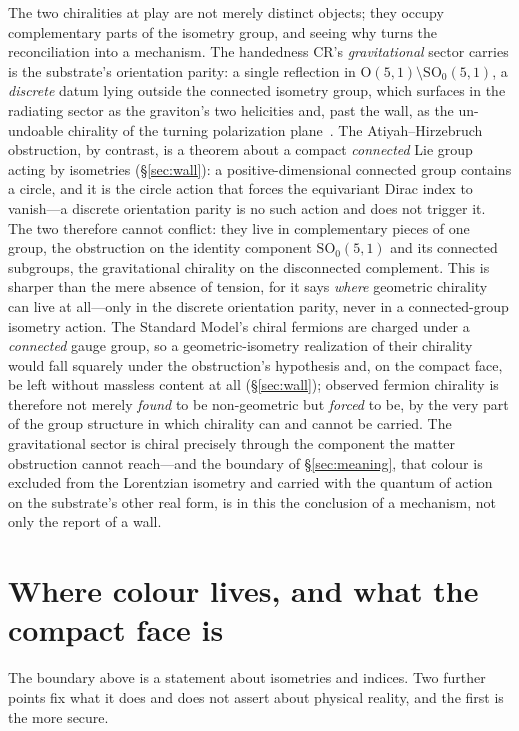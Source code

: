 \documentclass[11pt]{article}
\theoremstyle{plain}
\theoremstyle{remark}
\begin{document}
The two chiralities at play are not merely distinct objects; they occupy complementary parts of the isometry group, and seeing why turns the reconciliation into a mechanism. The handedness CR's \emph{gravitational} sector carries is the substrate's orientation parity: a single reflection in $\mathrm{O}(5,1)\setminus\mathrm{SO}_0(5,1)$, a \emph{discrete} datum lying outside the connected isometry group, which surfaces in the radiating sector as the graviton's two helicities and, past the wall, as the un-undoable chirality of the turning polarization plane~\cite{JanzenDynamics, JanzenAlgebroid}. The Atiyah--Hirzebruch obstruction, by contrast, is a theorem about a compact \emph{connected} Lie group acting by isometries (\S\ref{sec:wall}): a positive-dimensional connected group contains a circle, and it is the circle action that forces the equivariant Dirac index to vanish---a discrete orientation parity is no such action and does not trigger it. The two therefore cannot conflict: they live in complementary pieces of one group, the obstruction on the identity component $\mathrm{SO}_0(5,1)$ and its connected subgroups, the gravitational chirality on the disconnected complement. This is sharper than the mere absence of tension, for it says \emph{where} geometric chirality can live at all---only in the discrete orientation parity, never in a connected-group isometry action. The Standard Model's chiral fermions are charged under a \emph{connected} gauge group, so a geometric-isometry realization of their chirality would fall squarely under the obstruction's hypothesis and, on the compact face, be left without massless content at all (\S\ref{sec:wall}); observed fermion chirality is therefore not merely \emph{found} to be non-geometric but \emph{forced} to be, by the very part of the group structure in which chirality can and cannot be carried. The gravitational sector is chiral precisely through the component the matter obstruction cannot reach---and the boundary of \S\ref{sec:meaning}, that colour is excluded from the Lorentzian isometry and carried with the quantum of action on the substrate's other real form, is in this the conclusion of a mechanism, not only the report of a wall.

\section{Where colour lives, and what the compact face is}\label{sec:ontology}

The boundary above is a statement about isometries and indices. Two further points fix what it does and does not assert about physical reality, and the first is the more secure.
\end{document}
